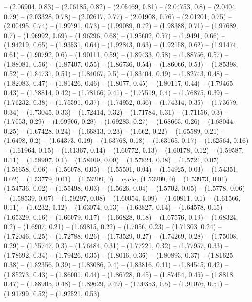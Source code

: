 -- (2.06904, 0.83)
-- (2.06185, 0.82)
-- (2.05469, 0.81)
-- (2.04753, 0.8)
-- (2.0404, 0.79)
-- (2.03328, 0.78)
-- (2.02617, 0.77)
-- (2.01908, 0.76)
-- (2.01201, 0.75)
-- (2.00495, 0.74)
-- (1.99791, 0.73)
-- (1.99089, 0.72)
-- (1.98388, 0.71)
-- (1.97689, 0.7)
-- (1.96992, 0.69)
-- (1.96296, 0.68)
-- (1.95602, 0.67)
-- (1.9491, 0.66)
-- (1.94219, 0.65)
-- (1.93531, 0.64)
-- (1.92843, 0.63)
-- (1.92158, 0.62)
-- (1.91474, 0.61)
-- (1.90792, 0.6)
-- (1.90111, 0.59)
-- (1.89433, 0.58)
-- (1.88756, 0.57)
-- (1.88081, 0.56)
-- (1.87407, 0.55)
-- (1.86736, 0.54)
-- (1.86066, 0.53)
-- (1.85398, 0.52)
-- (1.84731, 0.51)
-- (1.84067, 0.5)
-- (1.83404, 0.49)
-- (1.82743, 0.48)
-- (1.82083, 0.47)
-- (1.81426, 0.46)
-- (1.8077, 0.45)
-- (1.80117, 0.44)
-- (1.79465, 0.43)
-- (1.78814, 0.42)
-- (1.78166, 0.41)
-- (1.77519, 0.4)
-- (1.76875, 0.39)
-- (1.76232, 0.38)
-- (1.75591, 0.37)
-- (1.74952, 0.36)
-- (1.74314, 0.35)
-- (1.73679, 0.34)
-- (1.73045, 0.33)
-- (1.72414, 0.32)
-- (1.71784, 0.31)
-- (1.71156, 0.3)
-- (1.7053, 0.29)
-- (1.69906, 0.28)
-- (1.69283, 0.27)
-- (1.68663, 0.26)
-- (1.68044, 0.25)
-- (1.67428, 0.24)
-- (1.66813, 0.23)
-- (1.662, 0.22)
-- (1.65589, 0.21)
-- (1.6498, 0.2)
-- (1.64373, 0.19)
-- (1.63768, 0.18)
-- (1.63165, 0.17)
-- (1.62564, 0.16)
-- (1.61964, 0.15)
-- (1.61367, 0.14)
-- (1.60772, 0.13)
-- (1.60178, 0.12)
-- (1.59587, 0.11)
-- (1.58997, 0.1)
-- (1.58409, 0.09)
-- (1.57824, 0.08)
-- (1.5724, 0.07)
-- (1.56658, 0.06)
-- (1.56078, 0.05)
-- (1.55501, 0.04)
-- (1.54925, 0.03)
-- (1.54351, 0.02)
-- (1.53779, 0.01)
-- (1.53209, 0)
-- cycle;
\drawBand (1.53209, 0)
-- (1.53973, 0.01)
-- (1.54736, 0.02)
-- (1.55498, 0.03)
-- (1.5626, 0.04)
-- (1.5702, 0.05)
-- (1.5778, 0.06)
-- (1.58539, 0.07)
-- (1.59297, 0.08)
-- (1.60054, 0.09)
-- (1.60811, 0.1)
-- (1.61566, 0.11)
-- (1.6232, 0.12)
-- (1.63074, 0.13)
-- (1.63827, 0.14)
-- (1.64578, 0.15)
-- (1.65329, 0.16)
-- (1.66079, 0.17)
-- (1.66828, 0.18)
-- (1.67576, 0.19)
-- (1.68324, 0.2)
-- (1.6907, 0.21)
-- (1.69815, 0.22)
-- (1.7056, 0.23)
-- (1.71303, 0.24)
-- (1.72046, 0.25)
-- (1.72788, 0.26)
-- (1.73529, 0.27)
-- (1.74269, 0.28)
-- (1.75008, 0.29)
-- (1.75747, 0.3)
-- (1.76484, 0.31)
-- (1.77221, 0.32)
-- (1.77957, 0.33)
-- (1.78692, 0.34)
-- (1.79426, 0.35)
-- (1.8016, 0.36)
-- (1.80893, 0.37)
-- (1.81625, 0.38)
-- (1.82356, 0.39)
-- (1.83086, 0.4)
-- (1.83816, 0.41)
-- (1.84545, 0.42)
-- (1.85273, 0.43)
-- (1.86001, 0.44)
-- (1.86728, 0.45)
-- (1.87454, 0.46)
-- (1.8818, 0.47)
-- (1.88905, 0.48)
-- (1.89629, 0.49)
-- (1.90353, 0.5)
-- (1.91076, 0.51)
-- (1.91799, 0.52)
-- (1.92521, 0.53)
